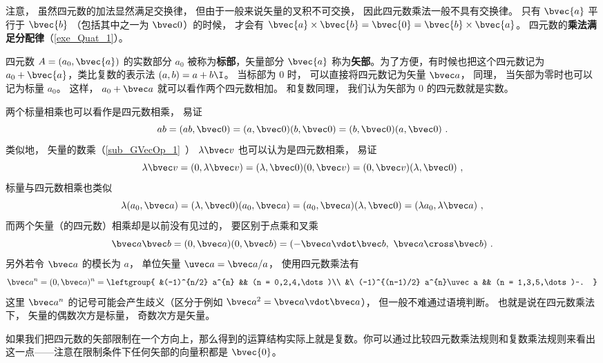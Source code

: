 注意， 虽然四元数的加法显然满足交换律， 但由于一般来说矢量的叉积不可交换， 因此四元数乘法一般不具有交换律。 只有 $\bvec{a}$ 平行于 $\bvec{b}$ （包括其中之一为 $\bvec 0$）的时候， 才会有 $\bvec{a}\times\bvec{b}= \bvec{0} =\bvec{b}\times\bvec{a}$。 四元数的\textbf{乘法满足分配律}（\autoref{exe_Quat_1}）。

四元数 $A=(a_0, \bvec{a})$ 的实数部分 $a_0$ 被称为\textbf{标部}，矢量部分 $\bvec{a}$ 称为\textbf{矢部}。为了方便，有时候也把这个四元数记为 $a_0+\bvec{a}$，类比复数的表示法 $(a, b)=a+b\I$。 当标部为 $0$ 时， 可以直接将四元数记为矢量 $\bvec a$， 同理， 当矢部为零时也可以记为标量 $a_0$。 这样， $a_0 + \bvec a$ 就可以看作两个四元数相加。 和复数同理， 我们认为矢部为 $0$ 的四元数就是实数。

\begin{example}{}
两个标量相乘也可以看作是四元数相乘， 易证
\begin{equation}
ab = (ab, \bvec 0) = (a,\bvec 0)(b,\bvec 0) = (b,\bvec 0)(a,\bvec 0)~.
\end{equation}
类似地， 矢量的数乘（\autoref{sub_GVecOp_1}~） $\lambda\bvec v$ 也可以认为是四元数相乘， 易证
\begin{equation}
\lambda\bvec v = (0, \lambda\bvec v) = (\lambda, \bvec 0)(0, \bvec v) = (0, \bvec v)(\lambda, \bvec 0)~,
\end{equation}
标量与四元数相乘也类似
\begin{equation}
\lambda (a_0, \bvec a) = (\lambda,\bvec 0) (a_0, \bvec a) = (a_0, \bvec a)(\lambda,\bvec 0) = (\lambda a_0, \lambda\bvec a)~,
\end{equation}
而两个矢量（的四元数）相乘却是以前没有见过的， 要区别于点乘和叉乘
\begin{equation}
\bvec a\bvec b = (0, \bvec a)(0, \bvec b) = (-\bvec a\vdot\bvec b,\ \bvec a\cross\bvec b)~.
\end{equation}
另外若令 $\bvec a$ 的模长为 $a$， 单位矢量 $\uvec a = \bvec a/a$， 使用四元数乘法有
\begin{equation}
\bvec a^{n} = (0, \bvec a)^{n} =
\leftgroup{
&(-1)^{n/2} a^{n} && (n = 0,2,4,\dots)\\
&\ (-1)^{(n-1)/2} a^{n}\uvec a && (n = 1,3,5,\dots)~.
}
\end{equation}
这里 $\bvec a^{n}$ 的记号可能会产生歧义（区分于例如 $\bvec a^2 = \bvec a\vdot\bvec a$）， 但一般不难通过语境判断。 也就是说在四元数乘法下， 矢量的偶数次方是标量， 奇数次方是矢量。
\end{example}

如果我们把四元数的矢部限制在一个方向上，那么得到的运算结构实际上就是复数。你可以通过比较四元数乘法规则和复数乘法规则来看出这一点——注意在限制条件下任何矢部的向量积都是 $\bvec{0}$。

